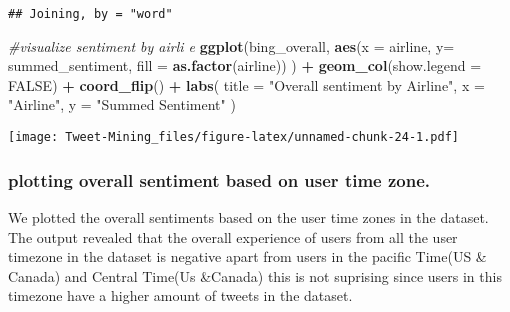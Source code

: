 \documentclass[
]{article}
\newenvironment{Shaded}{\begin{snugshade}}{\end{snugshade}}
\newcommand{\CommentTok}[1]{\textcolor[rgb]{0.56,0.35,0.01}{\textit{#1}}}
\newcommand{\DataTypeTok}[1]{\textcolor[rgb]{0.13,0.29,0.53}{#1}}
\newcommand{\KeywordTok}[1]{\textcolor[rgb]{0.13,0.29,0.53}{\textbf{#1}}}
\newcommand{\NormalTok}[1]{#1}
\newcommand{\OperatorTok}[1]{\textcolor[rgb]{0.81,0.36,0.00}{\textbf{#1}}}
\newcommand{\OtherTok}[1]{\textcolor[rgb]{0.56,0.35,0.01}{#1}}
\newcommand{\StringTok}[1]{\textcolor[rgb]{0.31,0.60,0.02}{#1}}
\begin{document}
\begin{verbatim}
## Joining, by = "word"
\end{verbatim}

\begin{Shaded}
\begin{Highlighting}[]
\CommentTok{#visualize sentiment by airli e}
\KeywordTok{ggplot}\NormalTok{(bing_overall,}
  \KeywordTok{aes}\NormalTok{(}\DataTypeTok{x =}\NormalTok{ airline, }\DataTypeTok{y=}\NormalTok{ summed_sentiment, }\DataTypeTok{fill =} \KeywordTok{as.factor}\NormalTok{(airline))}
\NormalTok{) }\OperatorTok{+}\StringTok{ }
\StringTok{  }\KeywordTok{geom_col}\NormalTok{(}\DataTypeTok{show.legend =} \OtherTok{FALSE}\NormalTok{) }\OperatorTok{+}
\StringTok{  }\KeywordTok{coord_flip}\NormalTok{() }\OperatorTok{+}
\StringTok{  }\KeywordTok{labs}\NormalTok{(}
    \DataTypeTok{title =} \StringTok{"Overall sentiment by Airline"}\NormalTok{,}
    \DataTypeTok{x =} \StringTok{"Airline"}\NormalTok{,}
    \DataTypeTok{y =} \StringTok{"Summed Sentiment"}
\NormalTok{  )}
\end{Highlighting}
\end{Shaded}

\texttt{[image: Tweet-Mining\_files/figure-latex/unnamed-chunk-24-1.pdf]}

\hypertarget{plotting-overall-sentiment-based-on-user-time-zone.}{%
\subsubsection{plotting overall sentiment based on user time
zone.}\label{plotting-overall-sentiment-based-on-user-time-zone.}}

We plotted the overall sentiments based on the user time zones in the
dataset. The output revealed that the overall experience of users from
all the user timezone in the dataset is negative apart from users in the
pacific Time(US \& Canada) and Central Time(Us \&Canada) this is not
suprising since users in this timezone have a higher amount of tweets in
the dataset.

\begin{Shaded}
\end{Shaded}
\end{document}
